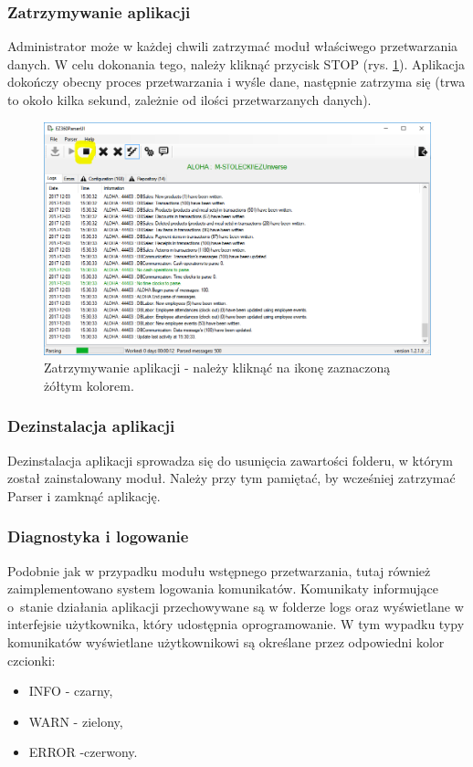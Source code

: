 \documentclass[a4paper]{book}
\begin{document}
\subsubsection{Zatrzymywanie aplikacji}
Administrator może w każdej chwili zatrzymać moduł właściwego przetwarzania danych. W celu dokonania tego, należy kliknąć przycisk STOP (rys. \ref{fig:zatrzymywanie_aplikacji}). Aplikacja dokończy obecny proces przetwarzania i wyśle dane, następnie zatrzyma się (trwa to około kilka sekund, zależnie od ilości przetwarzanych danych).
\begin{figure}[t]
	\centering
	\includegraphics[width=\textwidth]{./img/zatrzymywanie_aplikacji.png}
	\caption{Zatrzymywanie aplikacji - należy kliknąć na ikonę zaznaczoną żółtym kolorem.}
	\label{fig:zatrzymywanie_aplikacji}
\end{figure}
\subsubsection{Dezinstalacja aplikacji}
Dezinstalacja aplikacji sprowadza się do usunięcia zawartości folderu, w którym został zainstalowany moduł. Należy przy tym pamiętać, by wcześniej zatrzymać Parser i zamknąć aplikację.
\subsubsection{Diagnostyka i logowanie}
Podobnie jak w przypadku modułu wstępnego przetwarzania, tutaj również zaimplementowano system logowania komunikatów. Komunikaty informujące o~stanie działania aplikacji przechowywane są w folderze logs oraz wyświetlane w interfejsie użytkownika, który udostępnia oprogramowanie. W tym wypadku typy komunikatów wyświetlane użytkownikowi są określane przez odpowiedni kolor czcionki:
 \begin{itemize}
 	\item INFO - czarny,
 	\item WARN - zielony,
 	\item ERROR -czerwony.
 \end{itemize}
\end{document}
